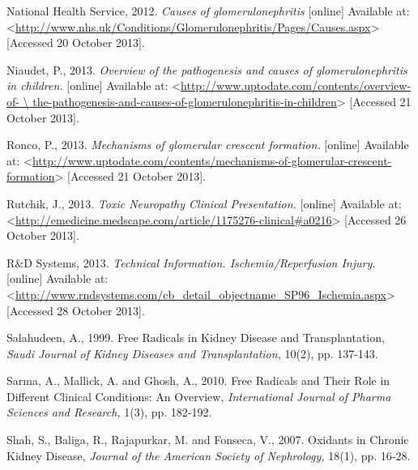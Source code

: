 \documentclass[11pt]{report}
\begin{document}
National Health Service, 2012. \textit{Causes of glomerulonephritis} [online] Available at: <\url{http://www.nhs.uk/Conditions/Glomerulonephritis/Pages/Causes.aspx}> [Accessed 20 October 2013].
\newline
\newline

Niaudet, P., 2013. \textit{Overview of the pathogenesis and causes of glomerulonephritis in children.} [online] Available at: <\url{http://www.uptodate.com/contents/overview-of- \ the-pathogenesis-and-causes-of-glomerulonephritis-in-children}> [Accessed 21 October 2013].
\newline
\newline

Ronco, P., 2013. \textit{Mechanisms of glomerular crescent formation.} [online] Available at: <\url{http://www.uptodate.com/contents/mechanisms-of-glomerular-crescent-formation}> [Accessed 21 October 2013].
\newline
\newline

Rutchik, J., 2013. \textit{Toxic Neuropathy Clinical Presentation.} [online] Available at: <\url{http://emedicine.medscape.com/article/1175276-clinical#a0216}> [Accessed 26 October 2013].
\newline
\newline

R\&D Systems, 2013. \textit{Technical Information. Ischemia/Reperfusion Injury.} [online] Available at: <\url{http://www.rndsystems.com/cb_detail_objectname_SP96_Ischemia.aspx}> [Accessed 28 October 2013].
\newline
\newline

Salahudeen, A., 1999. Free Radicals in Kidney Disease and Transplantation, \textit{Saudi Journal of Kidney Diseases and Transplantation,} 10(2), pp. 137-143.
\newline
\newline

Sarma, A., Mallick, A. and Ghosh, A., 2010. Free Radicals and Their Role in Different Clinical Conditions: An Overview, \textit{International Journal of Pharma Sciences and Research,} 1(3), pp. 182-192.
\newline
\newline

Shah, S., Baliga, R., Rajapurkar, M. and Fonseca, V., 2007. Oxidants in Chronic Kidney Disease, \textit{Journal of the American Society of Nephrology,} 18(1), pp. 16-28.
\newline
\newline
\end{document}
